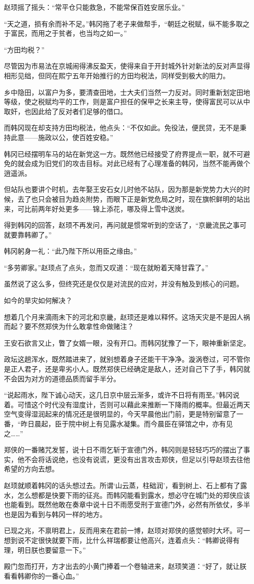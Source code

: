 赵顼摇了摇头：“常平仓只能救急，不能常保百姓安居乐业。”

“天之道，损有余而补不足。”韩冈拖了老子来做帮手，“朝廷之税赋，纵不能多取之于富民，而用之于贫者，也当均之如一。”

“方田均税？”

尽管因为市易法在京城闹得沸反盈天，使得来自于开封城外针对新法的反对声显得相形见绌，但同在熙宁五年开始推行的方田均税法，同样受到极大的阻力。

乡中隐田，以富户为多，要清查田地，士大夫们当然一力反对。同时重新划定田地等级，使之税赋均平的工作，则是富户担任的保甲之长来主导，使得富民可以从中取奸，也因此给了反对者们足够的借口。

而韩冈现在却支持方田均税法，他点头：“不仅如此。免役法，便民贷，无不是秉持此意——施政以公，使百姓安稳。”

韩冈已经摆明车马的站在新党这一方。既然他已经接受了府界提点一职，就不可避免的就会成为旧党们的攻击目标。对此已经有了心理准备的韩冈，当然不能再做个逍遥派。

但站队也要讲个时机，去年娶王安石女儿时他不站队，因为那是新党势力大兴的时候，去了也只会被目为趋炎附势，而眼下正是新党危局之时，现在旗帜鲜明的站出来，可比前两年好处更多——锦上添花，哪及得上雪中送炭。

得到韩冈的回答，赵顼不再发问，再问就是惯常听到的空话了，“京畿流民之事可就要靠韩卿了。”

韩冈躬身一礼：“此乃陛下所以用臣之缘由。”

“多劳卿家。”赵顼点了点头，忽而又叹道：“现在就盼着天降甘霖了。”

虽然说了这么多，但终究还是仅仅是对流民的应对，并没有触及到核心的问题。

如今的旱灾如何解决？

想着几个月来滴雨未下的河北和京畿，赵顼还是难以释怀。这场天灾是不是因人祸而起？要不然郑侠为什么敢拿性命做赌注？

王安石欲言又止，瞥了女婿一眼，没有开口。而韩冈犹豫了一下，眼神重新坚定。

政坛这趟浑水，既然踏进来了，就别想着身子还能干干净净。漩涡卷过，可不管你是正人君子，还是卑劣小人。既然郑侠已经确定是敌人，还对自己下了手，韩冈就不会因为对方的道德品质而留手半分。

“说起雨水，陛下诚心动天，这几日京中层云渐多，或许不日将有雨至。”韩冈说着。可惜这个时代没有湿度计，否则可以藉此来推断一下降雨的概率。但最近两天空气变得湿润起来的情况还是很明显的，今天早晨他出门前，更是特别留意了一番，“昨日晨起，臣于院中树上有见露水凝集。而今晨臣在驿馆之中，亦有见之……”

郑侠的一番赌咒发誓，说十日不雨乞斩于宣德门外，韩冈则是轻轻巧巧的摆出了事实，他不会将话说绝，也没有说谎，更没有出言攻击郑侠，但足以引导赵顼去往他希望的方向去想。

赵顼就顺着韩冈的话头想过去。所谓‘山云蒸，柱础润’，看到树上、石上都有了露水，怎么想都是快要下雨的征兆。而韩冈能看到露水，想必守在城门处的郑侠应该也能看到。既然他敢在奏章中说十日不雨愿受刑于宣德门外，必然有所依仗，多半也是因为看到与韩冈一样的地方。

已现之兆，不禀明君上，反而用来在君前一博，赵顼对郑侠的感觉顿时大坏。可一想到说不定很快就要下雨，比什么祥瑞都要让他高兴，连着点头：“韩卿说得有理，明日朕也要留意一下。”

殿门忽而打开，方才出去的小黄门捧着一个卷轴进来，赵顼笑道：“好了，就让朕看看韩卿你的一番心血。”

